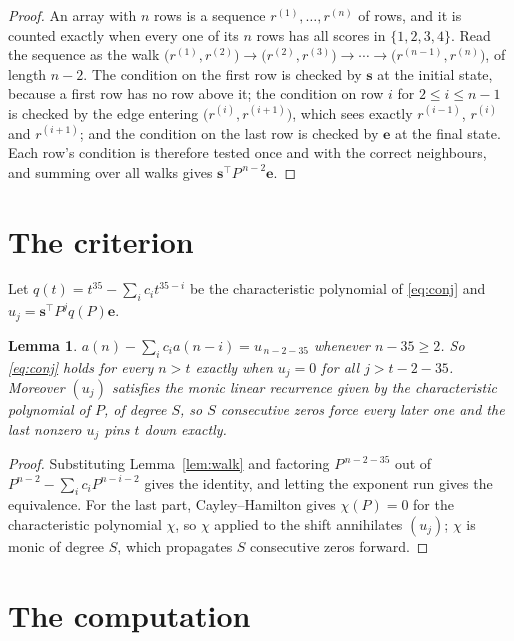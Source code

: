 \documentclass[11pt,a4paper]{article}
\theoremstyle{plain}
\newtheorem{lemma}[theorem]{Lemma}
\theoremstyle{definition}
\begin{document}
\begin{proof}
An array with $n$ rows is a sequence $r^{(1)},\dots,r^{(n)}$ of rows, and it is counted
exactly when every one of its $n$ rows has all scores in $\{1,2,3,4\}$. Read the sequence as the
walk $\bigl(r^{(1)},r^{(2)}\bigr)\to\bigl(r^{(2)},r^{(3)}\bigr)\to\cdots\to
\bigl(r^{(n-1)},r^{(n)}\bigr)$, of length $n-2$. The condition on the first row is
checked by $\mathbf{s}$ at the initial state, because a first row has no row above it; the
condition on row $i$ for $2\le i\le n-1$ is checked by the edge entering
$\bigl(r^{(i)},r^{(i+1)}\bigr)$, which sees exactly $r^{(i-1)}$, $r^{(i)}$ and
$r^{(i+1)}$; and the condition on the last row is checked by $\mathbf{e}$ at the final
state. Each row's condition is therefore tested once and with the correct neighbours, and
summing over all walks gives $\mathbf{s}^{\!\top}P^{\,n-2}\mathbf{e}$.
\end{proof}

\section{The criterion}

Let $q(t)=t^{35}-\sum_i c_i t^{35-i}$ be the characteristic polynomial of
\eqref{eq:conj} and $u_j=\mathbf{s}^{\!\top}P^{j}q(P)\mathbf{e}$.

\begin{lemma}\label{lem:crit}
$a(n)-\sum_i c_i a(n-i)=u_{\,n-2-35}$ whenever $n-35\ge2$. So \eqref{eq:conj}
holds for every $n>t$ exactly when $u_j=0$ for all $j>t-2-35$. Moreover $(u_j)$
satisfies the monic linear recurrence given by the characteristic polynomial of $P$, of
degree $S$, so $S$ consecutive zeros force every later one and the last nonzero $u_j$ pins
$t$ down exactly.
\end{lemma}

\begin{proof}
Substituting Lemma~\ref{lem:walk} and factoring $P^{\,n-2-35}$ out of
$P^{n-2}-\sum_i c_i P^{n-i-2}$ gives the identity, and letting the exponent run gives the
equivalence. For the last part, Cayley--Hamilton gives $\chi(P)=0$ for the characteristic
polynomial $\chi$, so $\chi$ applied to the shift annihilates $(u_j)$; $\chi$ is monic of
degree $S$, which propagates $S$ consecutive zeros forward.
\end{proof}

\section{The computation}
\end{document}
